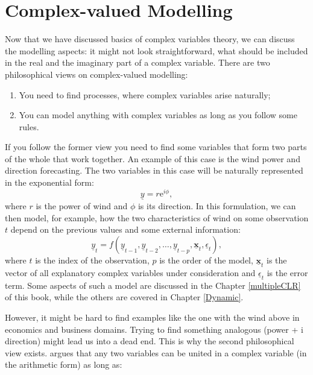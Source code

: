 \documentclass[
]{book}
\providecommand{\tightlist}{%
  \setlength{\itemsep}{0pt}\setlength{\parskip}{0pt}}
\begin{document}
\hypertarget{complexModelling}{%
\section{Complex-valued Modelling}\label{complexModelling}}

Now that we have discussed basics of complex variables theory, we can discuss the modelling aspects: it might not look straightforward, what should be included in the real and the imaginary part of a complex variable. There are two philosophical views on complex-valued modelling:

\begin{enumerate}
\def\labelenumi{\arabic{enumi}.}
\tightlist
\item
  You need to find processes, where complex variables arise naturally;
\item
  You can model anything with complex variables as long as you follow some rules.
\end{enumerate}

If you follow the former view you need to find some variables that form two parts of the whole that work together. An example of this case is the wind power and direction forecasting. The two variables in this case will be naturally represented in the exponential form:
\begin{equation*}
    \underline{y} = r \mathrm{e}^{i \phi} ,
\end{equation*}
where \(r\) is the power of wind and \(\phi\) is its direction. In this formulation, we can then model, for example, how the two characteristics of wind on some observation \(t\) depend on the previous values and some external information:
\begin{equation*}
    \underline{y}_t = f(\underline{y}_{t-1}, \underline{y}_{t-2}, \dots, \underline{y}_{t-p}, \underline{\mathbf{x}}_t, \underline{\epsilon}_t),
\end{equation*}
where \(t\) is the index of the observation, \(p\) is the order of the model, \(\underline{\mathbf{x}}_t\) is the vector of all explanatory complex variables under consideration and \(\underline{\epsilon}_t\) is the error term. Some aspects of such a model are discussed in the Chapter \ref{multipleCLR} of this book, while the others are covered in Chapter \ref{Dynamic}.

However, it might be hard to find examples like the one with the wind above in economics and business domains. Trying to find something analogous (power + i direction) might lead us into a dead end. This is why the second philosophical view exists. \citet{Svetunkov2012} argues that any two variables can be united in a complex variable (in the arithmetic form) as long as:
\end{document}
